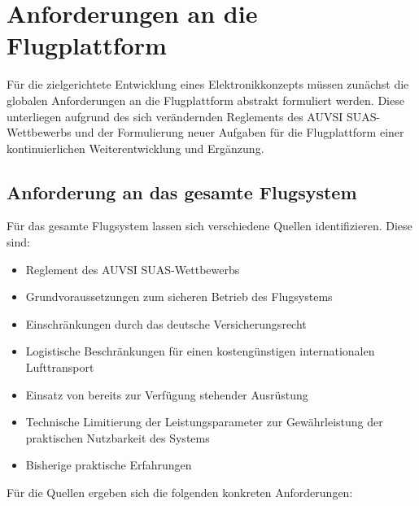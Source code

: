 \chapter{Anforderungen an die Flugplattform}\label{cha:Anforderungen an die Flugplattform}

Für die zielgerichtete Entwicklung eines Elektronikkonzepts müssen zunächst die globalen Anforderungen an die Flugplattform abstrakt formuliert werden. Diese unterliegen aufgrund des sich verändernden Reglements des AUVSI SUAS-Wettbewerbs und der Formulierung neuer Aufgaben für die Flugplattform einer kontinuierlichen Weiterentwicklung und Ergänzung.  

\section{Anforderung an das gesamte Flugsystem}

Für das gesamte Flugsystem lassen sich verschiedene Quellen identifizieren. 
Diese sind:

\begin{itemize}
\item Reglement des AUVSI SUAS-Wettbewerbs
\item Grundvoraussetzungen zum sicheren Betrieb des Flugsystems
\item Einschränkungen durch das deutsche Versicherungsrecht
\item Logistische Beschränkungen für einen kostengünstigen internationalen Lufttransport
\item Einsatz von bereits zur Verfügung stehender Ausrüstung 
\item Technische Limitierung der Leistungsparameter zur Gewährleistung der praktischen Nutzbarkeit des Systems
\item Bisherige praktische Erfahrungen
\end{itemize}

\vspace{7.5mm}

Für die Quellen ergeben sich die folgenden konkreten Anforderungen:

